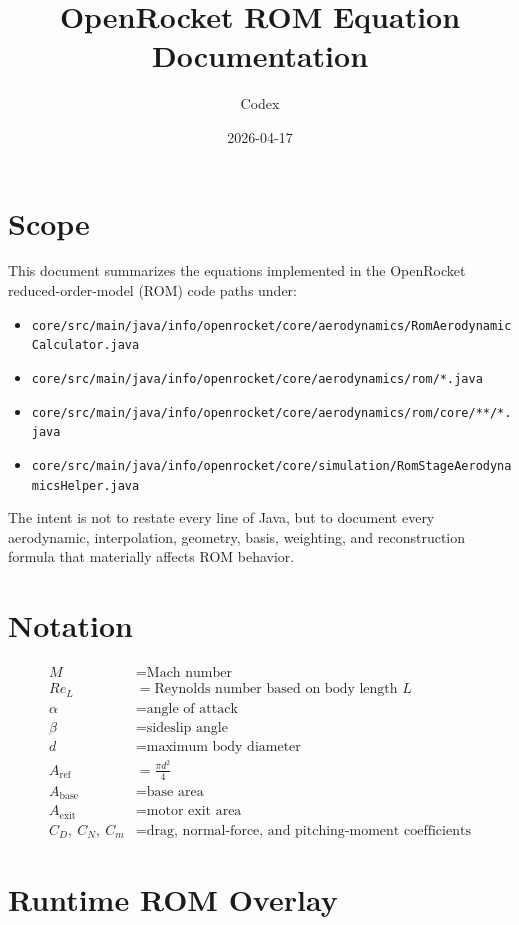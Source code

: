 \documentclass[11pt]{article}
\title{OpenRocket ROM Equation Documentation}
\author{Codex}
\date{2026-04-17}
\begin{document}
\maketitle

\section{Scope}
This document summarizes the equations implemented in the OpenRocket reduced-order-model (ROM) code paths under:
\begin{itemize}
\item \texttt{core/src/main/java/info/openrocket/core/aerodynamics/RomAerodynamicCalculator.java}
\item \texttt{core/src/main/java/info/openrocket/core/aerodynamics/rom/*.java}
\item \texttt{core/src/main/java/info/openrocket/core/aerodynamics/rom/core/**/*.java}
\item \texttt{core/src/main/java/info/openrocket/core/simulation/RomStageAerodynamicsHelper.java}
\end{itemize}

The intent is not to restate every line of Java, but to document every aerodynamic, interpolation, geometry, basis, weighting, and reconstruction formula that materially affects ROM behavior.

\section{Notation}
\begin{align*}
M &= \text{Mach number} \\
Re_L &= \text{Reynolds number based on body length } L \\
\alpha &= \text{angle of attack} \\
\beta &= \text{sideslip angle} \\
d &= \text{maximum body diameter} \\
A_{\mathrm{ref}} &= \frac{\pi d^2}{4} \\
A_{\mathrm{base}} &= \text{base area} \\
A_{\mathrm{exit}} &= \text{motor exit area} \\
C_D,\ C_N,\ C_m &= \text{drag, normal-force, and pitching-moment coefficients}
\end{align*}

\section{Runtime ROM Overlay}
\end{document}
